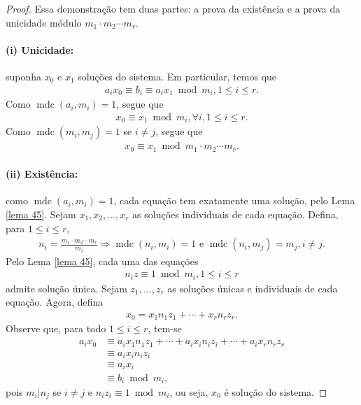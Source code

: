 \documentclass[a4paper,11pt,twoside, leqno]{article}
\DeclareMathOperator{\mdc}{mdc}
\theoremstyle{definition}
\begin{document}
\begin{proof}
	Essa demonstração tem duas partes: a prova da existência e a prova da unicidade módulo $m_1\cdot m_2\cdots m_r$.
	\paragraph{(i) Unicidade:} suponha $x_0$ e $x_1$ soluções do sistema. Em particular, temos que
	\begin{align*}
	a_ix_0 \equiv b_i \equiv a_ix_1\bmod m_i, 1\leq i\leq r.
	\end{align*}
	Como $\mdc(a_i, m_i) = 1$, segue que
	\begin{align*}
	x_0\equiv x_1\bmod m_i, \forall i, 1\leq i\leq r.
	\end{align*}
	Como $\mdc(m_i,m_j) = 1$ se $i\neq j$, segue que
	\begin{align*}
	x_0\equiv x_1\bmod m_1\cdot m_2\cdots m_r.
	\end{align*}
	\paragraph{(ii) Existência:} como $\mdc(a_i,m_i) = 1$, cada equação tem exatamente uma solução, pelo Lema \eqref{lema 45}. Sejam $x_1, x_2, \dots, x_r$ as soluções individuais de cada equação. Defina, para $1\leq i\leq r$, 
	\begin{align*}
	n_i = \frac{m_1\cdot m_2\cdots m_r}{m_i} \Rightarrow \mdc(n_i,m_i) = 1 \text{ e } \mdc(n_i,m_j) = m_j, i\neq j.
	\end{align*}
	Pelo Lema \eqref{lema 45}, cada uma das equações
	\begin{align*}
	n_iz\equiv 1\bmod m_i, 1\leq i\leq r
	\end{align*}
	admite solução única. Sejam $z_1, \dots, z_r$ as soluções únicas e individuais de cada equação. Agora, defina
	\begin{align*}
	x_0 = x_1n_1z_1 + \cdots + x_rn_rz_r.
	\end{align*}
	Observe que, para todo $1\leq i\leq r$, tem-se
	\begin{align*}
	a_ix_0 &\equiv a_ix_1n_1z_1 + \cdots + a_ix_in_iz_i + \cdots + a_ix_rn_rz_r \\
	&\equiv a_ix_in_iz_i \\
	&\equiv a_ix_i \\
	&\equiv b_i\bmod m_i,
	\end{align*}
	pois $m_i|n_j$ se $i\neq j$ e $n_iz_i\equiv 1\bmod m_i$, ou seja, $x_0$ é solução do sistema.
\end{proof}
\end{document}
